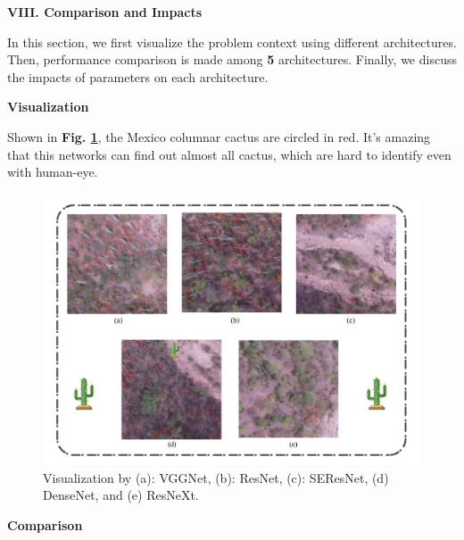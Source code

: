\documentclass[a4paper]{article}
\begin{document}
\vspace{5mm}
\begin{center}
\LARGE\textbf{VIII. Comparison and Impacts} \\
\end{center}

In this section, we first visualize the problem context using different architectures. Then, performance comparison is made among \textbf{5} architectures. Finally, we discuss the impacts of parameters on each architecture.

\vspace{2mm}
\begin{center}
\large\textbf{Visualization} \\
\end{center}

\large{
Shown in \textbf{Fig. \ref{cacuav5}}, the Mexico columnar cactus are circled in red. It's amazing that this networks can find out almost all cactus, which are hard to identify even with human-eye. 

\begin{figure}[h]
\centering
\includegraphics[width=15cm]{cacUAV5.pdf}
\caption{ Visualization by (a): \textsf{VGGNet}, (b): \textsf{ResNet}, (c): \textsf{SEResNet}, (d) \textsf{DenseNet}, and (e) \textsf{ResNeXt}.}
\label{cacuav5}
\end{figure}
}

\vspace{2mm}
\begin{center}
\large\textbf{Comparison} \\
\end{center}
\end{document}
